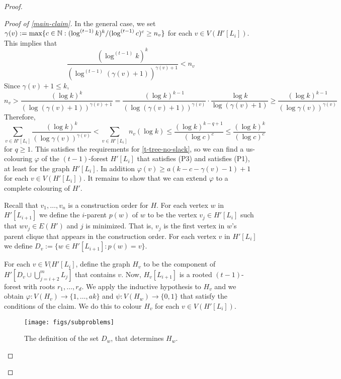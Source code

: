 \documentclass[kpfonts]{patmorin}
\theoremstyle{named}
\begin{document}
\begin{proof}
\begin{proof}[Proof of \cref{main-claim}]
        In the general case, we set $\gamma(v):=\max\{c\in\mathbb{N}:(\log^{(t-1)} k)^k/(\log^{(t-1)} c)^c \ge n_v\}$ for each $v\in V(H'[L_i])$.  This implies that
        \[
            \frac{(\log^{(t-1)} k)^k}{(\log^{(t-1)}(\gamma(v)+1))^{\gamma(v)+1}} < n_v
        \]
        Since $\gamma(v)+1\le k$,
        \[
           n_v > \frac{(\log k)^k}{(\log(\gamma(v)+1))^{\gamma(v)+1}}
           = \frac{(\log k)^{k-1}}{(\log(\gamma(v)+1))^{\gamma(v)}}
            \cdot
            \frac{\log k}{\log(\gamma(v)+1)}
           \ge
           \frac{(\log k)^{k-1}}{(\log\gamma(v))^{\gamma(v)}}
       \]
       Therefore,
       \[
           \sum_{v\in H'[L_i]} \frac{(\log k)^k}{(\log \gamma(v))^{\gamma(v)}} < \sum_{v\in H'[L_i]} n_v(\log k)
           \le \frac{(\log k)^{k-q+1}}{(\log c)^c}
           \le \frac{(\log k)^k}{(\log c)^c}
       \]
       for $q\ge 1$.  This satisfies the requirements for \cref{t-tree-no-slack}, so we can find a us-colouring $\varphi$ of the $(t-1)$-forest $H'[L_i]$ that satisfies (P3) and satisfies (P1), at least for the graph $H'[L_i]$. In addition $\varphi(v)\ge a(k-c-\gamma(v)-1)+1$ for each $v\in V(H'[L_i])$.  It remains to show that we can extend $\varphi$ to a complete colouring of $H'$.

       Recall that $v_1,\ldots,v_n$ is a construction order for $H$. For each vertex $w$ in $H'[L_{i+1}]$ we define the $i$-parent $p(w)$ of $w$ to be the vertex $v_j\in H'[L_i]$ such that $wv_j\in E(H')$ and $j$ is minimized.  That is, $v_j$ is the first vertex in $w$'s parent clique that appears in the construction order.  For each vertex $v$ in $H'[L_i]$ we define $D_v:=\{w\in H'[L_{i+1}]: p(w)=v\}$.

       For each $v\in V(H'[L_i]$, define the graph $H_v$ to be the component of $H'[D_v\cup \bigcup_{j=i+2}^m L_j]$ that contains $v$.
       Now, $H_v[L_{i+1}]$ is a rooted $(t-1)$-forest with roots $r_1,\ldots,r_d$.  We apply the inductive hypothesis to $H_v$ and we obtain $\varphi:V(H_v)\to\{1,\ldots,ak\}$ and $\psi:V(H_w)\to\{0,1\}$ that satisfy the conditions of the claim.  We do this to colour $H_v$ for each $v\in V(H'[L_i])$.

       \begin{figure}
           \begin{center}
                \texttt{[image: figs/subproblems]}
           \end{center}
           \caption{The definition of the set $D_w$, that determines $H_w$.}
           \label{subproblems}
       \end{figure}


\end{proof}
\end{proof}
\end{document}
